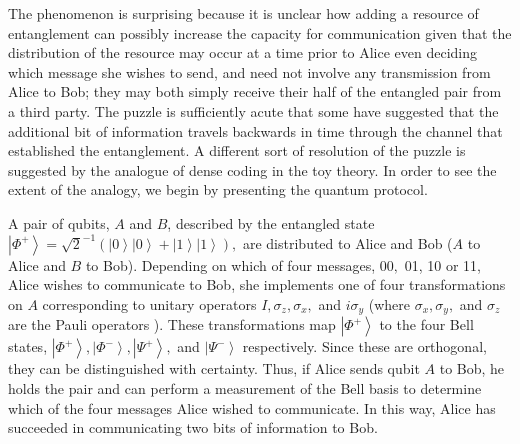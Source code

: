 \documentclass[pra,nofootinbib,showpacs,12pt]{revtex4}
\begin{document}
The phenomenon is surprising because it is unclear how adding a resource of
entanglement can possibly increase the capacity for communication given that
the distribution of the resource may occur at a time prior to Alice even
deciding which message she wishes to send, and need not involve any
transmission from Alice to Bob; they may both simply receive their half of
the entangled pair from a third party. The puzzle is sufficiently acute that
some have suggested that the additional bit of information travels backwards
in time through the channel that established the entanglement. A different
sort of resolution of the puzzle is suggested by the analogue of dense
coding in the toy theory. In order to see the extent of the analogy, we
begin by presenting the quantum protocol.

A pair of qubits, $A$ and $B$, described by the entangled state $\left| \Phi
^{+}\right\rangle =\sqrt{2}^{-1}(\left| 0\right\rangle \left| 0\right\rangle
+\left| 1\right\rangle \left| 1\right\rangle ),$ are distributed to Alice
and Bob ($A$ to Alice and $B$ to Bob). Depending on which of four messages, $%
00,$ 01, 10 or 11, Alice wishes to communicate to Bob, she implements one of
four transformations on $A$ corresponding to unitary operators $I,\sigma
_{z},\sigma _{x},$ and $i\sigma _{y}$ (where $\sigma _{x},\sigma _{y},$ and $%
\sigma _{z}$ are the Pauli operators \cite{NielsenChuang}). These
transformations map $\left| \Phi ^{+}\right\rangle $ to the four Bell
states, $\left| \Phi ^{+}\right\rangle ,\left| \Phi ^{-}\right\rangle
,\left| \Psi ^{+}\right\rangle ,$ and $\left| \Psi ^{-}\right\rangle $
respectively. Since these are orthogonal, they can be distinguished with
certainty. Thus, if Alice sends qubit $A$ to Bob, he holds the pair and can
perform a measurement of the Bell basis to determine which of the four
messages Alice wished to communicate. In this way, Alice has succeeded in
communicating two bits of information to Bob.
\end{document}
